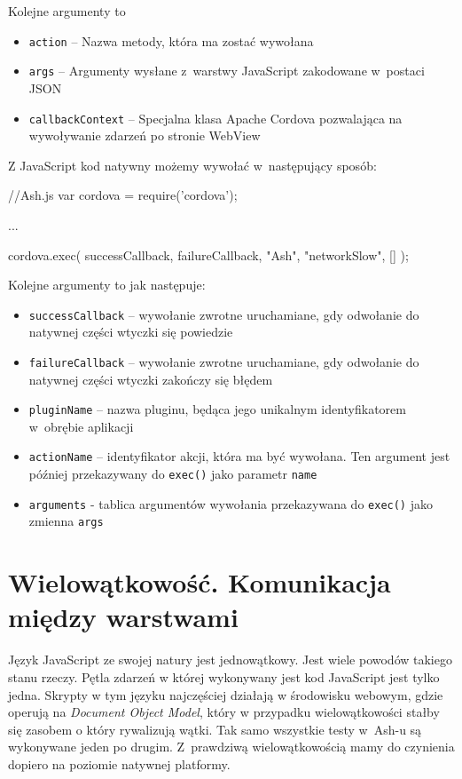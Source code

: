\documentclass[brudnopis]{xmgr}
\begin{document}
Kolejne argumenty to
\begin{itemize}
  \item \texttt{action} -- Nazwa metody, która ma zostać wywołana
  \item \texttt{args} -- Argumenty wysłane z~warstwy JavaScript zakodowane w~postaci JSON
  \item \texttt{callbackContext} -- Specjalna klasa Apache Cordova pozwalająca na wywoływanie zdarzeń po stronie WebView 
\end{itemize}

Z JavaScript kod natywny możemy wywołać w~następujący sposób:

\begin{javascriptcode}
//Ash.js
var cordova = require('cordova');

...

cordova.exec( 
        successCallback,
        failureCallback, 
        "Ash", 
        "networkSlow", 
        []
);
\end{javascriptcode}

Kolejne argumenty to jak następuje:
\begin{itemize}
  \item \texttt{successCallback} -- wywołanie zwrotne uruchamiane, gdy odwołanie do natywnej części wtyczki się powiedzie
  \item \texttt{failureCallback} -- wywołanie zwrotne uruchamiane, gdy odwołanie do natywnej części wtyczki zakończy się błędem
  \item \texttt{pluginName} -- nazwa pluginu, będąca jego unikalnym identyfikatorem w~obrębie aplikacji
  \item \texttt{actionName} -- identyfikator akcji, która ma być wywołana. Ten argument jest później przekazywany do \texttt{exec()} jako parametr \texttt{name} 
\item \texttt{arguments} - tablica argumentów wywołania przekazywana do \texttt{exec()} jako zmienna \texttt{args} 
\end{itemize}

\section{Wielowątkowość. Komunikacja między warstwami}

Język JavaScript ze swojej natury jest jednowątkowy. Jest wiele powodów takiego stanu rzeczy. Pętla zdarzeń w której wykonywany jest kod JavaScript jest tylko jedna. Skrypty w tym języku najczęściej działają w środowisku webowym, gdzie operują na \textit{Document Object Model}, który w przypadku wielowątkowości stałby się zasobem o który rywalizują wątki. Tak samo wszystkie testy w~Ash-u są wykonywane jeden po drugim.  Z~prawdziwą wielowątkowością mamy do czynienia dopiero na poziomie natywnej platformy.
\end{document}

